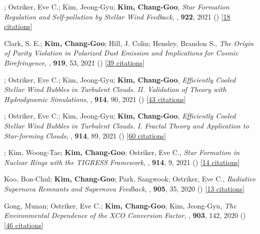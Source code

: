 \item[{23.}]; Ostriker, Eve C.; Kim, Jeong-Gyu; \textbf{Kim, Chang-Goo}, \textit{Star Formation Regulation and Self-pollution by Stellar Wind Feedback}, , \textbf{922}, 2021 () [\href{http://adsabs.harvard.edu/abs/2021ApJ...922L...3L}{18 citations}]

\item[{22.}]Clark, S. E.; \textbf{Kim, Chang-Goo}; Hill, J. Colin; Hensley, Brandon S., \textit{The Origin of Parity Violation in Polarized Dust Emission and Implications for Cosmic Birefringence}, , \textbf{919}, 53, 2021 () [\href{http://adsabs.harvard.edu/abs/2021ApJ...919...53C}{39 citations}]

\item[{21.}]; Ostriker, Eve C.; Kim, Jeong-Gyu; \textbf{Kim, Chang-Goo}, \textit{Efficiently Cooled Stellar Wind Bubbles in Turbulent Clouds. II. Validation of Theory with Hydrodynamic Simulations}, , \textbf{914}, 90, 2021 () [\href{http://adsabs.harvard.edu/abs/2021ApJ...914...90L}{43 citations}]

\item[{20.}]; Ostriker, Eve C.; Kim, Jeong-Gyu; \textbf{Kim, Chang-Goo}, \textit{Efficiently Cooled Stellar Wind Bubbles in Turbulent Clouds. I. Fractal Theory and Application to Star-forming Clouds}, , \textbf{914}, 89, 2021 () [\href{http://adsabs.harvard.edu/abs/2021ApJ...914...89L}{60 citations}]

\item[{19.}]; Kim, Woong-Tae; \textbf{Kim, Chang-Goo}; Ostriker, Eve C., \textit{Star Formation in Nuclear Rings with the TIGRESS Framework}, , \textbf{914}, 9, 2021 () [\href{http://adsabs.harvard.edu/abs/2021ApJ...914....9M}{14 citations}]

\item[{18.}]Koo, Bon-Chul; \textbf{Kim, Chang-Goo}; Park, Sangwook; Ostriker, Eve C., \textit{Radiative Supernova Remnants and Supernova Feedback}, , \textbf{905}, 35, 2020 () [\href{http://adsabs.harvard.edu/abs/2020ApJ...905...35K}{13 citations}]

\item[{17.}]Gong, Munan; Ostriker, Eve C.; \textbf{Kim, Chang-Goo}; Kim, Jeong-Gyu, \textit{The Environmental Dependence of the XCO Conversion Factor}, , \textbf{903}, 142, 2020 () [\href{http://adsabs.harvard.edu/abs/2020ApJ...903..142G}{46 citations}]

